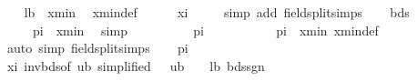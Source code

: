 \begin{isabellebody}
\isanewline
\ \ \isamarkupfalse%
\ {\isachardoublequoteopen}lb\ {\isasymle}\ xmin{\isachardoublequoteclose}\ \isamarkupfalse%
\ xmin{\isacharunderscore}{\kern0pt}def\isanewline
\ \ \ \ \isamarkupfalse%
\ xi{\isacharparenleft}{\kern0pt}{}{\isacharparenright}{\kern0pt}\ {\isacartoucheopen}{}\ {\isacharless}{\kern0pt}\ {\isasymxi}{\isacartoucheclose}\ \isamarkupfalse%
\ {\isacharparenleft}{\kern0pt}simp\ add{\isacharcolon}{\kern0pt}\ field{\isacharunderscore}{\kern0pt}split{\isacharunderscore}{\kern0pt}simps{\isacharparenright}{\kern0pt}\isanewline
\ \ \isamarkupfalse%
\ bds{\isacharparenleft}{\kern0pt}{}{\isacharparenright}{\kern0pt}\ \isamarkupfalse%
\ {\isachardoublequoteopen}{}\ {\isacharslash}{\kern0pt}\ {\isacharparenleft}{\kern0pt}{}\ {\isacharasterisk}{\kern0pt}\ pi{\isacharparenright}{\kern0pt}\ {\isacharless}{\kern0pt}\ xmin{\isachardoublequoteclose}\ \isamarkupfalse%
\ simp\isanewline
\isanewline
\ \ \isamarkupfalse%
\ {\isachardoublequoteopen}{\isasymxi}\ {\isacharasterisk}{\kern0pt}\ {}\ {\isacharless}{\kern0pt}\ {}\ {\isacharasterisk}{\kern0pt}\ pi{\isachardoublequoteclose}\ \isanewline
\ \ \ \ \isamarkupfalse%
\ {\isacartoucheopen}{}\ {\isacharslash}{\kern0pt}\ {\isacharparenleft}{\kern0pt}{}\ {\isacharasterisk}{\kern0pt}\ pi{\isacharparenright}{\kern0pt}\ {\isacharless}{\kern0pt}\ xmin{\isacartoucheclose}\ xmin{\isacharunderscore}{\kern0pt}def\ {\isacartoucheopen}{}\ {\isacharless}{\kern0pt}\ {\isasymxi}{\isacartoucheclose}\ \isamarkupfalse%
\ {\isacharparenleft}{\kern0pt}auto\ simp{\isacharcolon}{\kern0pt}\ field{\isacharunderscore}{\kern0pt}split{\isacharunderscore}{\kern0pt}simps{\isacharparenright}{\kern0pt}\isanewline
\isanewline
\ \ \isamarkupfalse%
\ {\isachardoublequoteopen}pi\ {\isacharless}{\kern0pt}\ {\isasymxi}\ {\isacharasterisk}{\kern0pt}\ {}{\isachardoublequoteclose}\isanewline
\ \ \ \ \isamarkupfalse%
\ xi{\isacharparenleft}{\kern0pt}{}{\isacharparenright}{\kern0pt}\ invbds{\isacharparenleft}{\kern0pt}{}{\isacharparenright}{\kern0pt}{\isacharbrackleft}{\kern0pt}of\ {\isachardoublequoteopen}{}{\isacharslash}{\kern0pt}ub{\isachardoublequoteclose}{\isacharcomma}{\kern0pt}\ simplified{\isacharbrackright}{\kern0pt}\ {\isacartoucheopen}{}\ {\isacharslash}{\kern0pt}\ ub\ {\isasymle}\ {}\ {\isacharslash}{\kern0pt}\ lb{\isacartoucheclose}\ bdssgn{\isacharparenleft}{\kern0pt}{}{\isacharparenright}{\kern0pt}\ \isamarkupfalse%

\end{isabellebody}
